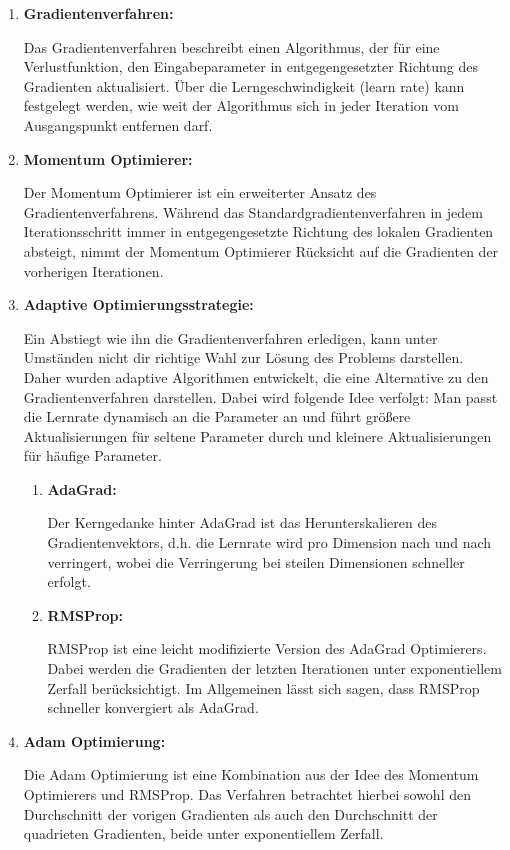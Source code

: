 	\begin{enumerate}
		\item \textbf{Gradientenverfahren:}
		
			Das Gradientenverfahren beschreibt einen Algorithmus, der für eine Verlustfunktion, den Eingabeparameter in entgegengesetzter Richtung des Gradienten aktualisiert. Über die  Lerngeschwindigkeit (learn rate) kann festgelegt werden, wie weit der Algorithmus sich in jeder Iteration vom Ausgangspunkt entfernen darf. \cite{lucas_plagwitz}
		
		\item \textbf{Momentum Optimierer:}
		
			Der Momentum Optimierer ist ein erweiterter Ansatz des Gradientenverfahrens. Während das \glqq Standardgradientenverfahren\grqq{} in jedem Iterationsschritt immer in entgegengesetzte Richtung des lokalen Gradienten absteigt, nimmt der Momentum Optimierer Rücksicht auf die Gradienten der vorherigen Iterationen. \cite{lucas_plagwitz}
			
		\item \textbf{Adaptive Optimierungsstrategie:}
		
			Ein Abstiegt wie ihn die Gradientenverfahren erledigen, kann unter Umständen nicht dir richtige Wahl zur Lösung des Problems darstellen. Daher wurden adaptive Algorithmen entwickelt, die eine Alternative zu den Gradientenverfahren darstellen. Dabei wird folgende Idee verfolgt: Man passt die Lernrate dynamisch an die Parameter an und führt größere Aktualisierungen für seltene Parameter durch und kleinere Aktualisierungen für häufige Parameter. \cite{lucas_plagwitz}
			
			\begin{enumerate}
				\item \textbf{AdaGrad:}
				
					Der Kerngedanke hinter AdaGrad ist das Herunterskalieren des Gradientenvektors, d.h. die Lernrate wird pro Dimension nach und nach verringert, wobei die Verringerung bei steilen Dimensionen schneller erfolgt. \cite{lucas_plagwitz}
					
				\item \textbf{RMSProp:}
				
					RMSProp ist eine leicht modifizierte Version des AdaGrad Optimierers. Dabei werden die Gradienten der letzten Iterationen unter exponentiellem Zerfall  berücksichtigt. Im Allgemeinen lässt sich sagen, dass RMSProp schneller konvergiert als AdaGrad. \cite{lucas_plagwitz}
				
					
			\end{enumerate}
		
			
		\item \textbf{Adam Optimierung:}
		
			Die Adam Optimierung ist eine Kombination aus der Idee des Momentum Optimierers und RMSProp. Das Verfahren betrachtet hierbei sowohl den Durchschnitt der vorigen Gradienten als auch den Durchschnitt der quadrieten Gradienten, beide unter exponentiellem Zerfall. \cite{lucas_plagwitz}
			
	\end{enumerate}

